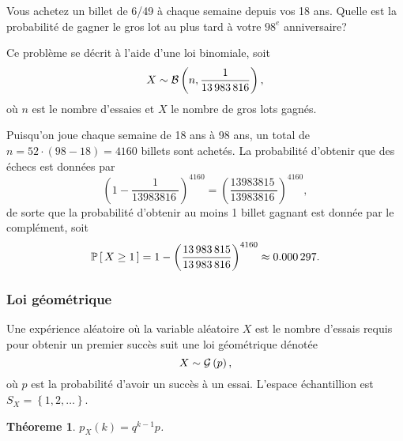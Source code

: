\documentclass[11pt]{article}
\renewcommand\P[1]{%
	\ensuremath{%
		\mathbb{P}\left[\,#1\,\right]%
	}%
}%
\newcommand\Bin[2]{%
	\ensuremath{%
		\mathcal{B}\left(#1,#2\right)%
	}%
}%
\newcommand\Geo[1]{%
	\ensuremath{%
		\mathcal{G}\left(#1\right)%
	}%
}%
\newtheorem{theoreme}{Théoreme}[section]
\begin{document}
\vspace{-5mm}
\begin{exemple}
	Vous achetez un billet de 6/49 à chaque semaine depuis vos 18 ans. Quelle
	est la probabilité de gagner le gros lot au plus tard à votre $98^e$
	anniversaire?
	
	Ce problème se décrit à l'aide d'une loi binomiale, soit
	\begin{equation*}
		X\sim\Bin{n}{\frac{1}{\SI{13983816}{}}},
	\end{equation*}
	où $n$ est le nombre d'essaies et $X$ le nombre de gros lots gagnés.
	\vspace{-1mm}
\end{exemple}\pagebreak
\addtocounter{exemple}{-1}
\begin{exemple}[suite]
	Puisqu'on joue chaque semaine de 18 ans à 98 ans, un total de
	$n=52\cdot(98-18)=4160$ billets sont achetés. La probabilité d'obtenir que
	des échecs est données par
	\begin{equation*}
		\left(1-\frac{1}{\SI{13983816}{}}\right)^{4160}=
		\left(\frac{\SI{13983815}{}}{\SI{13983816}{}}\right)^{4160},
	\end{equation*}
	de sorte que la probabilité d'obtenir au moins 1 billet gagnant est donnée
	par le complément, soit
	\begin{equation*}
		\P{X\geq 1}
		=1-\left(\frac{\SI{13983815}{}}{\SI{13983816}{}}\right)^{4160}
		\approx\SI{0.000297}{}.
	\end{equation*}
\end{exemple}

\subsubsection{Loi géométrique}
Une expérience aléatoire où la variable aléatoire $X$ est le nombre d'essais
requis pour obtenir un premier succès suit une loi géométrique dénotée
\begin{equation*}
	X\sim\Geo{p},
\end{equation*}
où $p$ est la probabilité d'avoir un succès à un essai. L'espace échantillion
est $S_X=\left\{1,2,\dots\right\}$.

\begin{theoreme}
	$p_X(k)=q^{k-1}p$.
\end{theoreme}
\end{document}
